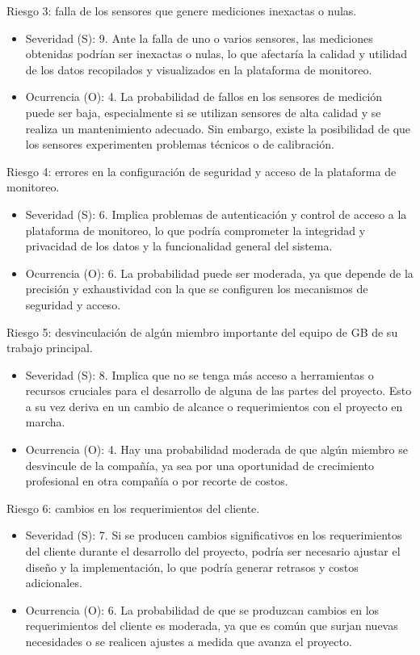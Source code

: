 \documentclass[
11pt, %
]{charter}
\begin{document}
Riesgo 3: falla de los sensores que genere mediciones inexactas o nulas.
\begin{itemize}
	\item Severidad (S): 9. Ante la falla de uno o varios sensores, las mediciones obtenidas podrían ser inexactas o nulas, lo que afectaría la calidad y utilidad de los datos recopilados y visualizados en la plataforma de monitoreo.
	\item Ocurrencia (O): 4. La probabilidad de fallos en los sensores de medición puede ser baja, especialmente si se utilizan sensores de alta calidad y se realiza un mantenimiento adecuado. Sin embargo, existe la posibilidad de que los sensores experimenten problemas técnicos o de calibración.
\end{itemize}

Riesgo 4: errores en la configuración de seguridad y acceso de la plataforma de monitoreo.
\begin{itemize}
	\item Severidad (S): 6. Implica problemas de autenticación y control de acceso a la plataforma de monitoreo, lo que podría comprometer la integridad y privacidad de los datos y la funcionalidad general del sistema.
	\item Ocurrencia (O): 6. La probabilidad puede ser moderada, ya que depende de la precisión y exhaustividad con la que se configuren los mecanismos de seguridad y acceso.
\end{itemize}

Riesgo 5: desvinculación de algún miembro importante del equipo de GB de su trabajo principal.
\begin{itemize}
	\item Severidad (S): 8. Implica que no se tenga más acceso a herramientas o recursos cruciales para el desarrollo de alguna de las partes del proyecto. Esto a su vez deriva en un cambio de alcance o requerimientos con el proyecto en marcha.
	\item Ocurrencia (O): 4. Hay una probabilidad moderada de que algún miembro se desvincule de la compañía, ya sea por una oportunidad de crecimiento profesional en otra compañía o por recorte de costos.
\end{itemize}

Riesgo 6: cambios en los requerimientos del cliente.
\begin{itemize}
	\item Severidad (S): 7. Si se producen cambios significativos en los requerimientos del cliente durante el desarrollo del proyecto, podría ser necesario ajustar el diseño y la implementación, lo que podría generar retrasos y costos adicionales.
	\item Ocurrencia (O): 6. La probabilidad de que se produzcan cambios en los requerimientos del cliente es moderada, ya que es común que surjan nuevas necesidades o se realicen ajustes a medida que avanza el proyecto.
\end{itemize}
\end{document}
